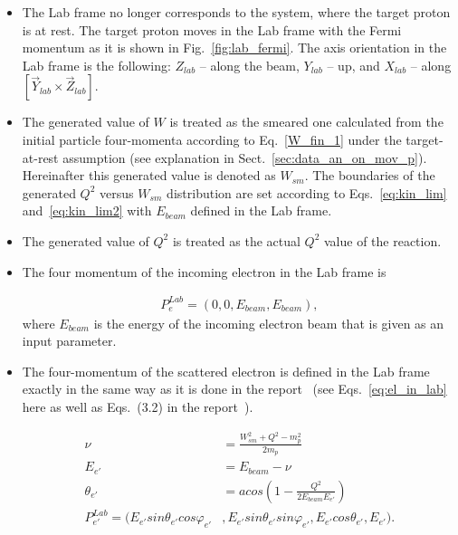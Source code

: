 \begin{itemize}
\item The Lab frame no longer corresponds to the system, where the target proton is at rest. The target proton moves in the Lab frame with the Fermi momentum as it is shown in Fig.~\ref{fig:lab_fermi}. The axis orientation in the Lab frame is the following: $Z_{lab}$ -- along the beam, $Y_{lab}$ -- up, and $X_{lab}$ -- along $[\vec Y_{lab} \times \vec Z_{lab}]$. 

\item The generated value of $W$ is treated as the smeared one calculated from the initial particle four-momenta according to Eq.~\eqref{W_fin_1} under the target-at-rest assumption (see explanation in Sect.~\ref{sec:data_an_on_mov_p}). Hereinafter this generated value is denoted as $W_{sm}$. The boundaries of the generated $Q^{2}$ versus $W_{sm}$ distribution are set according to Eqs.~\eqref{eq:kin_lim} and~\eqref{eq:kin_lim2} with $E_{beam}$ defined in the Lab frame.

\item The generated value of $Q^{2}$ is treated as the actual $Q^{2}$ value of the reaction. 



\item The four momentum of the incoming electron in the Lab frame is 

\begin{equation}
\begin{aligned}\label{mom_e_ini}
P_{e}^{Lab} = (0, 0, E_{beam}, E_{beam}),
\end{aligned}
\end{equation}
where $E_{beam}$ is the energy of the incoming electron beam that is given as an input parameter.



\item The four-momentum of the scattered electron is defined in the Lab frame exactly in the same way as it is done in the report~\cite{twopeg} (see Eqs.~\eqref{eq:el_in_lab} here as well as Eqs.~(3.2) in the report~\cite{twopeg}). 

\begin{equation}
\begin{split}\label{eq:el_in_lab}
  \nu &= \frac{W_{sm}^2+Q^2-m_{p}^{2}}{2m_{p}}\\
  E_{e'} &= E_{beam}-\nu\\
 \theta_{e'} &= acos\left (1-\frac{Q^2}{2E_{beam}E_{e'}}\right )\\
P_{e'}^{Lab} = (E_{e'}sin \theta_{e'}cos \varphi_{e'}&,E_{e'}sin \theta_{e'}sin \varphi_{e'},E_{e'}cos \theta_{e'},E_{e'}).
\end{split}
\end{equation}


\end{itemize}
